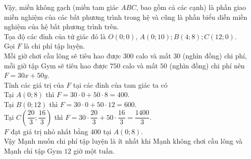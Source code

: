 \begin{ex}
{\begin{center}
\end{center}
Vậy, miền không gạch (miền tam giác $ABC$, bao gồm cả các cạnh) là phần giao miền nghiệm của các bất phương trình trong hệ và cũng là phần biểu diễn miền nghiệm của hệ bất phương trình trên.\\
Tọa độ các đỉnh của tứ giác đó là $O (0;0)$, $A(0;10);B (4;8);C(12;0)$.\\
Gọi $F$ là chi phí tập luyện.\\
Mỗi giờ chơi cầu lông sẽ tiêu hao được $300$ calo và mất $30$ (nghìn đồng) chi phí, mỗi giờ tập Gym sẽ tiêu hao được $750$ calo và mất $50$ (nghìn đồng) chi phí nên $F=30x+50y$.\\
Tính các giá trị của $F$ tại các đỉnh của tam giác ta có\\
Tại $A(0;8)$ thì $ F=30\cdot 0+50\cdot 8=400$.\\
Tại $B(0;12)$ thì $ F=30\cdot 0+50\cdot 12=600$.\\
Tại $C\left(\dfrac{20}{3};\dfrac{16}{3}\right)$ thì $ F=30\cdot \dfrac{20}{3}+50\cdot \dfrac{16}{3}=\dfrac{1400}{3}$.\\
$F$ đạt giá trị nhỏ nhất bằng $400$ tại $A(0;8)$.\\
Vậy Mạnh muốn chi phí tập luyện là ít nhất khi Mạnh không chơi cầu lông và Mạnh chỉ tập Gym $12$ giờ một tuần.
}
\end{ex}

